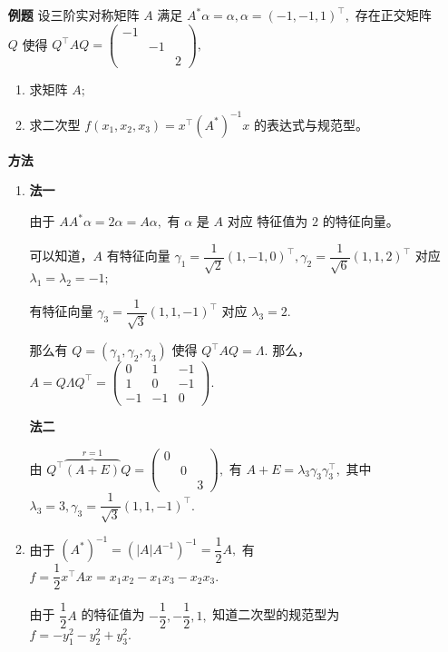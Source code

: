 \begin{enumerate}
    \item[\textbf{例题}] 设三阶实对称矩阵 $ A $ 满足 $ A^*\alpha = \alpha, \alpha = (-1,-1,1)^\top, $ 
    存在正交矩阵 $ Q $ 使得 $ Q^\top AQ = \begin{pmatrix}
        -1&&\\&-1&\\&&2
    \end{pmatrix}, $ 
    \begin{enumerate}
        \item 求矩阵 $ A; $ 
        \item 求二次型 $ f(x_1,x_2,x_3)=x^\top (A^*)^{-1}x $ 的表达式与规范型。
    \end{enumerate}
    \item[\textbf{方法}] 
    \begin{enumerate}
        \item \textbf{法一}
        
        由于 $ AA^*\alpha = 2\alpha = A\alpha, $ 有 $ \alpha $ 是 $ A $ 对应
        特征值为 $ 2 $ 的特征向量。
        
        可以知道，$ A $ 有特征向量 
        $ \gamma_1 = \dfrac{1}{\sqrt 2}(1,-1,0)^\top, \gamma_2 = \dfrac{1}{\sqrt 6}
        (1,1,2)^\top $ 对应 $ \lambda_1 = \lambda_2 = -1; $ 
        
        有特征向量 $ \gamma_3 = \dfrac{1}{\sqrt 3}(1,1,-1)^\top $ 
        对应 $ \lambda_3 = 2. $ 
        
        那么有 $ Q = (\gamma_1,\gamma_2,\gamma_3) $ 使得 $ Q^\top AQ = \Lambda. $ 
        那么，$ A = Q\Lambda Q^\top = \begin{pmatrix}
            0&1&-1\\1&0&-1\\-1&-1&0
        \end{pmatrix}. $ 

        \textbf{法二}

        由 $ Q^\top \overbrace{(A+E)}^{r=1}Q = \begin{pmatrix}
            0&&\\&0&\\&&3
        \end{pmatrix}, $ 有 $ A+E = \lambda_3\gamma_3\gamma_3^\top, $ 
        其中 $ \lambda_3 = 3, \gamma_3 = \dfrac{1}{\sqrt 3}(1,1,-1)^\top. $ 
        \item 由于 $ (A^*)^{-1} = (|A|A^{-1})^{-1} = \dfrac{1}{2}A, $ 有 $ f = \dfrac{1}{2}x^\top Ax = x_1x_2 - x_1x_3 - x_2x_3. $ 
        
        由于 $ \dfrac{1}{2}A $ 的特征值为 $ -\dfrac{1}{2},-\dfrac{1}{2},1, $ 知道二次型的规范型为
        $ f = -y_1^2 - y_2^2 + y_3^2. $ 
    \end{enumerate}
\end{enumerate}

